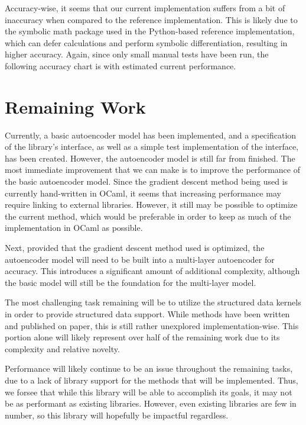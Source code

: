 \documentclass{sig-alternate}
\begin{document}
Accuracy-wise, it seems that our current implementation suffers from a bit of inaccuracy
when compared to the reference implementation. This is likely due to the symbolic math
package used in the Python-based reference implementation, which can defer calculations
and perform symbolic differentiation, resulting in higher accuracy. Again, since only
small manual tests have been run, the following accuracy chart is with estimated current
performance. 

\section{Remaining Work}
\label{sec:project_proposal}

Currently, a basic autoencoder model has been implemented, and a specification of the library's
interface, as well as a simple test implementation of the interface, has been created. 
However, the autoencoder model is still far from finished. The most immediate improvement
that we can make is to improve the performance of the basic autoencoder model. Since the gradient
descent method being used is currently hand-written in OCaml, it seems that increasing 
performance may require linking to external libraries. However, it still may be possible to
optimize the current method, which would be preferable in order to keep as much of the 
implementation in OCaml as possible.

Next, provided that the gradient descent method used is optimized, the autoencoder model will 
need to be built into a multi-layer autoencoder for accuracy. This introduces a significant
amount of additional complexity, although the basic model will still be the foundation for
the multi-layer model. 

The most challenging task remaining will be to utilize the structured data kernels in order to
provide structured data support. While methods have been written and published on paper,
this is still rather unexplored implementation-wise. This portion alone will likely represent
over half of the remaining work due to its complexity and relative novelty. 

Performance will likely continue to be an issue throughout the remaining tasks, due to a lack
of library support for the methods that will be implemented. Thus, we forsee that while this 
library will be able to accomplish its goals, it may not be as performant as existing 
libraries. However, even existing libraries are few in number, so this library will hopefully
be impactful regardless. 
\end{document}
